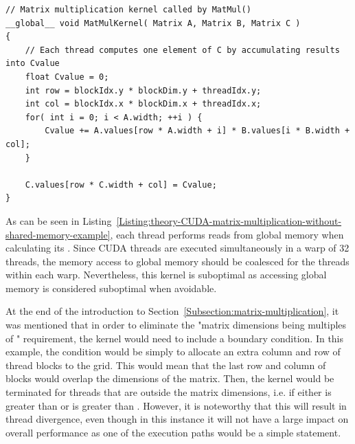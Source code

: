 \begin{lstlisting}[caption={Definition of the matrix multiplication kernel that uses global memory without shared memory. Each thread has a variable \code{Cvalue} stored in registers into which it calculates its specific \code{C(row, col)} matrix element. Taken from Nvidia's \emph{CUDA C++ Programming Guide} \cite{NVIDIAMay2022}.},label={Listing:theory-CUDA-matrix-multiplication-without-shared-memory-example}]
// Matrix multiplication kernel called by MatMul()
__global__ void MatMulKernel( Matrix A, Matrix B, Matrix C )
{
	// Each thread computes one element of C by accumulating results into Cvalue
	float Cvalue = 0;
	int row = blockIdx.y * blockDim.y + threadIdx.y;
	int col = blockIdx.x * blockDim.x + threadIdx.x;
	for( int i = 0; i < A.width; ++i ) {
		Cvalue += A.values[row * A.width + i] * B.values[i * B.width + col];
	}

	C.values[row * C.width + col] = Cvalue;
}
\end{lstlisting}

As can be seen in Listing~\ref{Listing:theory-CUDA-matrix-multiplication-without-shared-memory-example}, each thread performs  reads from global memory when calculating its . Since CUDA threads are executed simultaneously in a warp of 32 threads, the memory access to global memory should be coalesced for the threads within each warp. Nevertheless, this kernel is suboptimal as accessing global memory is considered suboptimal when avoidable.
\par At the end of the introduction to Section~\ref{Subsection:matrix-multiplication}, it was mentioned that in order to eliminate the "matrix dimensions being multiples of " requirement, the kernel would need to include a boundary condition. In this example, the condition would be simply to allocate an extra column and row of thread blocks to the grid. This would mean that the last row and column of blocks would overlap the dimensions of the matrix. Then, the kernel would be terminated for threads that are outside the matrix dimensions, i.e. if either  is greater than  or  is greater than . However, it is noteworthy that this will result in thread divergence, even though in this instance it will not have a large impact on overall performance as one of the execution paths would be a simple  statement.

